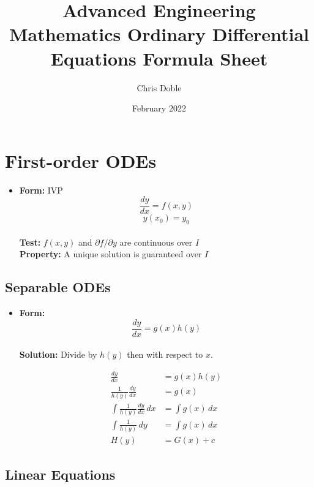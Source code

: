 \documentclass{article}
\title{Advanced Engineering Mathematics Ordinary Differential Equations Formula Sheet}
\author{Chris Doble}
\date{February 2022}
\begin{document}
\tableofcontents

\section{First-order ODEs}

\begin{itemize}
  \item \textbf{Form:} IVP \[\frac{d y}{d x} = f(x, y)\] \[y(x_0) = y_0\] \\ \textbf{Test:} $f(x, y)$ and $\partial f / \partial y$ are continuous over $I$ \\ \textbf{Property:} A unique solution is guaranteed over $I$
\end{itemize}

\subsection{Separable ODEs}

\begin{itemize}
  \item \textbf{Form:} \[\frac{d y}{d x} = g(x) h(y)\] \\ \textbf{Solution:} Divide by $h(y)$ then with respect to $x$.

        \begin{align*}
          \frac{d y}{d x}                          & = g(x) h(y)      \\
          \frac{1}{h(y)} \frac{d y}{d x}           & = g(x)           \\
          \int \frac{1}{h(y)} \frac{d y}{d x} \,dx & = \int g(x) \,dx \\
          \int \frac{1}{h(y)} \,dy                 & = \int g(x) \,dx \\
          H(y)                                     & = G(x) + c
        \end{align*}
\end{itemize}

\subsection{Linear Equations}
\end{document}
